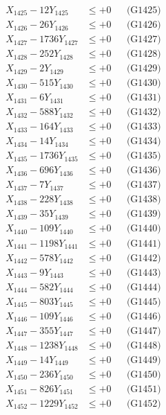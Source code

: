 \documentclass[a4paper,10pt]{article}
\begin{document}
{\begin{align}
X_{1425} - 12Y_{1425} &\leq +0 && \text{(G1425)} \\
X_{1426} - 26Y_{1426} &\leq +0 && \text{(G1426)} \\
X_{1427} - 1736Y_{1427} &\leq +0 && \text{(G1427)} \\
X_{1428} - 252Y_{1428} &\leq +0 && \text{(G1428)} \\
X_{1429} - 2Y_{1429} &\leq +0 && \text{(G1429)} \\
X_{1430} - 515Y_{1430} &\leq +0 && \text{(G1430)} \\
\allowbreak
X_{1431} - 6Y_{1431} &\leq +0 && \text{(G1431)} \\
X_{1432} - 588Y_{1432} &\leq +0 && \text{(G1432)} \\
X_{1433} - 164Y_{1433} &\leq +0 && \text{(G1433)} \\
X_{1434} - 14Y_{1434} &\leq +0 && \text{(G1434)} \\
X_{1435} - 1736Y_{1435} &\leq +0 && \text{(G1435)} \\
X_{1436} - 696Y_{1436} &\leq +0 && \text{(G1436)} \\
X_{1437} - 7Y_{1437} &\leq +0 && \text{(G1437)} \\
X_{1438} - 228Y_{1438} &\leq +0 && \text{(G1438)} \\
X_{1439} - 35Y_{1439} &\leq +0 && \text{(G1439)} \\
X_{1440} - 109Y_{1440} &\leq +0 && \text{(G1440)} \\
\allowbreak
X_{1441} - 1198Y_{1441} &\leq +0 && \text{(G1441)} \\
X_{1442} - 578Y_{1442} &\leq +0 && \text{(G1442)} \\
X_{1443} - 9Y_{1443} &\leq +0 && \text{(G1443)} \\
X_{1444} - 582Y_{1444} &\leq +0 && \text{(G1444)} \\
X_{1445} - 803Y_{1445} &\leq +0 && \text{(G1445)} \\
X_{1446} - 109Y_{1446} &\leq +0 && \text{(G1446)} \\
X_{1447} - 355Y_{1447} &\leq +0 && \text{(G1447)} \\
X_{1448} - 1238Y_{1448} &\leq +0 && \text{(G1448)} \\
X_{1449} - 14Y_{1449} &\leq +0 && \text{(G1449)} \\
X_{1450} - 236Y_{1450} &\leq +0 && \text{(G1450)} \\
\allowbreak
X_{1451} - 826Y_{1451} &\leq +0 && \text{(G1451)} \\
X_{1452} - 1229Y_{1452} &\leq +0 && \text{(G1452)} \\

\end{align}}
\end{document}
